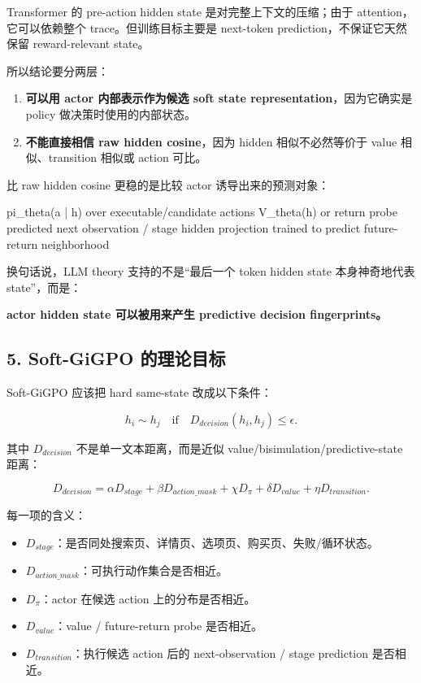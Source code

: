\documentclass[
  10pt,
]{ctexart}
\newenvironment{Shaded}{}{}
\newcommand{\NormalTok}[1]{#1}
\providecommand{\tightlist}{%
  \setlength{\itemsep}{0pt}\setlength{\parskip}{0pt}}
\begin{document}
Transformer 的 pre-action hidden state 是对完整上下文的压缩；由于
attention，它可以依赖整个 trace。但训练目标主要是 next-token
prediction，不保证它天然保留 reward-relevant state。

所以结论要分两层：

\begin{enumerate}
\def\labelenumi{\arabic{enumi}.}
\tightlist
\item
  \textbf{可以用 actor 内部表示作为候选 soft state
  representation}，因为它确实是 policy 做决策时使用的内部状态。
\item
  \textbf{不能直接相信 raw hidden cosine}，因为 hidden 相似不必然等价于
  value 相似、transition 相似或 action 可比。
\end{enumerate}

比 raw hidden cosine 更稳的是比较 actor 诱导出来的预测对象：

\begin{Shaded}
\begin{Highlighting}[]
\NormalTok{pi\_theta(a | h) over executable/candidate actions}
\NormalTok{V\_theta(h) or return probe}
\NormalTok{predicted next observation / stage}
\NormalTok{hidden projection trained to predict future{-}return neighborhood}
\end{Highlighting}
\end{Shaded}

换句话说，LLM theory 支持的不是``最后一个 token hidden state
本身神奇地代表 state''，而是：

\textbf{actor hidden state 可以被用来产生 predictive decision
fingerprints。}

\subsection{5. Soft-GiGPO
的理论目标}\label{soft-gigpo-ux7684ux7406ux8bbaux76eeux6807}

Soft-GiGPO 应该把 hard same-state 改成以下条件：

\[
h_i \sim h_j
\quad\text{if}\quad
D_{decision}(h_i,h_j)\le \epsilon.
\]

其中 \(D_{decision}\) 不是单一文本距离，而是近似
value/bisimulation/predictive-state 距离：

\[
D_{decision}
=
\alpha D_{stage}
+\beta D_{action\_mask}
+\chi D_{\pi}
+\delta D_{value}
+\eta D_{transition}.
\]

每一项的含义：

\begin{itemize}
\tightlist
\item
  \(D_{stage}\)：是否同处搜索页、详情页、选项页、购买页、失败/循环状态。
\item
  \(D_{action\_mask}\)：可执行动作集合是否相近。
\item
  \(D_{\pi}\)：actor 在候选 action 上的分布是否相近。
\item
  \(D_{value}\)：value / future-return probe 是否相近。
\item
  \(D_{transition}\)：执行候选 action 后的 next-observation / stage
  prediction 是否相近。
\end{itemize}
\end{document}
